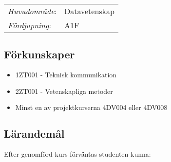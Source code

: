 \begin{tabular}{ll}\emph{Huvudområde}: & Datavetenskap\tabularnewline\emph{Fördjupning}: & A1F\tabularnewline\end{tabular}

\subsection*{Förkunskaper}

\begin{itemize}
\tightlist
\item
  1ZT001 - Teknisk kommunikation
\item
  2ZT001 - Vetenskapliga metoder
\item
  Minst en av projektkurserna 4DV004 eller 4DV008
\end{itemize}

\subsection*{Lärandemål}

Efter genomförd kurs förväntas studenten kunna:

